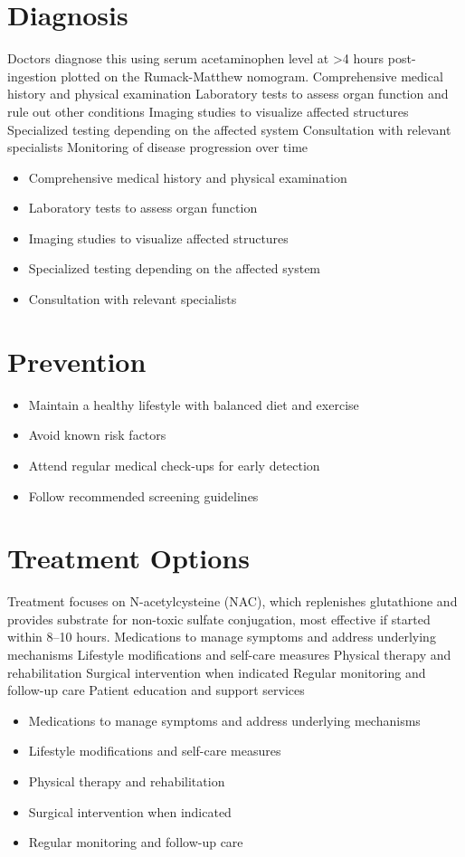 \section{Diagnosis}
Doctors diagnose this using serum acetaminophen level at >4 hours post-ingestion plotted on the Rumack-Matthew nomogram. Comprehensive medical history and physical examination Laboratory tests to assess organ function and rule out other conditions Imaging studies to visualize affected structures Specialized testing depending on the affected system Consultation with relevant specialists Monitoring of disease progression over time

\begin{itemize}[noitemsep]
  \item Comprehensive medical history and physical examination
  \item Laboratory tests to assess organ function
  \item Imaging studies to visualize affected structures
  \item Specialized testing depending on the affected system
  \item Consultation with relevant specialists
\end{itemize}
\section{Prevention}
\begin{itemize}[noitemsep]
  \item Maintain a healthy lifestyle with balanced diet and exercise
  \item Avoid known risk factors
  \item Attend regular medical check-ups for early detection
  \item Follow recommended screening guidelines
\end{itemize}
\section{Treatment Options}
Treatment focuses on N-acetylcysteine (NAC), which replenishes glutathione and provides substrate for non-toxic sulfate conjugation, most effective if started within 8--10 hours. Medications to manage symptoms and address underlying mechanisms Lifestyle modifications and self-care measures Physical therapy and rehabilitation Surgical intervention when indicated Regular monitoring and follow-up care Patient education and support services

\begin{itemize}[noitemsep]
  \item Medications to manage symptoms and address underlying mechanisms
  \item Lifestyle modifications and self-care measures
  \item Physical therapy and rehabilitation
  \item Surgical intervention when indicated
  \item Regular monitoring and follow-up care
\end{itemize}
